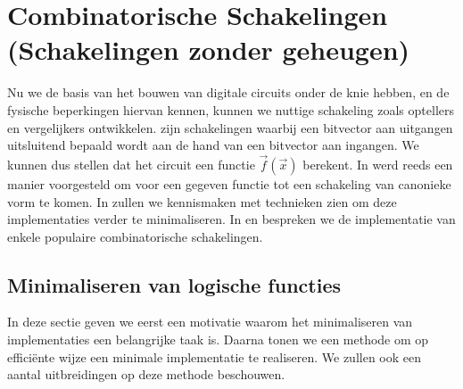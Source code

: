 \chapter{Combinatorische Schakelingen (Schakelingen zonder geheugen)}

\begin{chapterintro}
Nu we de basis van het bouwen van digitale circuits onder de knie hebben, en de fysische beperkingen hiervan kennen, kunnen we nuttige schakeling zoals optellers en vergelijkers ontwikkelen.  zijn schakelingen waarbij een bitvector aan uitgangen uitsluitend bepaald wordt aan de hand van een bitvector aan ingangen. We kunnen dus stellen dat het circuit een functie $\vec{f}(\vec{x})$ berekent. In  werd reeds een manier voorgesteld om voor een gegeven functie tot een schakeling van canonieke vorm te komen. In  zullen we kennismaken met technieken zien om deze implementaties verder te minimaliseren. In  en  bespreken we de implementatie van enkele populaire combinatorische schakelingen.
\end{chapterintro}

\minitoc[n]

\section{Minimaliseren van logische functies}

In deze sectie geven we eerst een motivatie waarom het minimaliseren van implementaties een belangrijke taak is. Daarna tonen we een methode om op effici\"ente wijze een minimale implementatie te realiseren. We zullen ook een aantal uitbreidingen op deze methode beschouwen.

